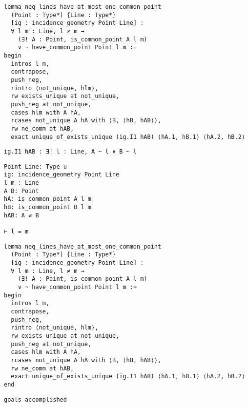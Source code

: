 \begin{frame}[fragile]
	\begin{multicols}{2}
		\begin{lstlisting}
lemma neq_lines_have_at_most_one_common_point 
  (Point : Type*) {Line : Type*} 
  [ig : incidence_geometry Point Line] :
  ∀ l m : Line, l ≠ m → 
    (∃! A : Point, is_common_point A l m) 
    ∨ ¬ have_common_point Point l m := 
begin
  intros l m,
  contrapose,
  push_neg,
  rintro ⟨not_unique, hlm⟩,
  rw exists_unique at not_unique,
  push_neg at not_unique,
  cases hlm with A hA,
  rcases not_unique A hA with ⟨B, ⟨hB, hAB⟩⟩,
  rw ne_comm at hAB,
  exact unique_of_exists_unique (ig.I1 hAB) ⟨hA.1, hB.1⟩ ⟨hA.2, hB.2⟩
\end{lstlisting}
		\vspace{1em}
		\begin{lstlisting}
ig.I1 hAB : ∃! l : Line, A ~ l ∧ B ~ l
\end{lstlisting}
		\columnbreak
		\begin{lstlisting}
Point Line: Type u
ig: incidence_geometry Point Line
l m : Line
A B: Point
hA: is_common_point A l m
hB: is_common_point B l m
hAB: A ≠ B

⊢ l = m
\end{lstlisting}
	\end{multicols}
\end{frame}










\begin{frame}[fragile]
	\begin{multicols}{2}
		\begin{lstlisting}
lemma neq_lines_have_at_most_one_common_point 
  (Point : Type*) {Line : Type*} 
  [ig : incidence_geometry Point Line] :
  ∀ l m : Line, l ≠ m → 
    (∃! A : Point, is_common_point A l m) 
    ∨ ¬ have_common_point Point l m := 
begin
  intros l m,
  contrapose,
  push_neg,
  rintro ⟨not_unique, hlm⟩,
  rw exists_unique at not_unique,
  push_neg at not_unique,
  cases hlm with A hA,
  rcases not_unique A hA with ⟨B, ⟨hB, hAB⟩⟩,
  rw ne_comm at hAB,
  exact unique_of_exists_unique (ig.I1 hAB) ⟨hA.1, hB.1⟩ ⟨hA.2, hB.2⟩
end
\end{lstlisting}
		\columnbreak
		\lstinline{goals accomplished} \checkmark
	\end{multicols}
\end{frame}





















